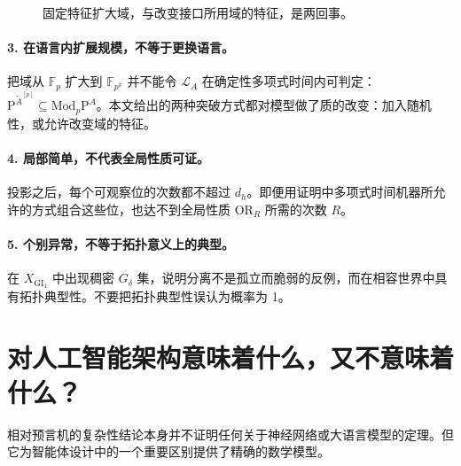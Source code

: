 \documentclass[11pt,a4paper]{article}
\newcommand{\F}{\mathbb F}
\newcommand{\MP}[1]{\mathrm{Mod}_{#1}\mathrm P}
\newcommand{\LA}{\mathcal L_A}
\newcommand{\GI}{\mathrm{GI}_1}
\newcommand{\OR}{\mathrm{OR}}
\begin{document}
\begin{figure}[htbp]\centering
{}
\caption{固定特征扩大域，与改变接口所用域的特征，是两回事。}
\end{figure}

\paragraph{3. 在语言内扩展规模，不等于更换语言。}
把域从 $\F_p$ 扩大到 $\F_{p^k}$ 并不能令 $\LA$ 在确定性多项式时间内可判定：$\mathrm P^{\widetilde A^{[p]}}\subseteq\MP p^A$。本文给出的两种突破方式都对模型做了质的改变：加入随机性，或允许改变域的特征。

\paragraph{4. 局部简单，不代表全局性质可证。}
投影之后，每个可观察位的次数都不超过 $d_h$。即便用证明中多项式时间机器所允许的方式组合这些位，也达不到全局性质 $\OR_R$ 所需的次数 $R$。

\paragraph{5. 个别异常，不等于拓扑意义上的典型。}
在 $X_{\GI}$ 中出现稠密 $G_\delta$ 集，说明分离不是孤立而脆弱的反例，而在相容世界中具有拓扑典型性。不要把拓扑典型性误认为概率为 1。

\section{对人工智能架构意味着什么，又不意味着什么？}
相对预言机的复杂性结论本身并不证明任何关于神经网络或大语言模型的定理。但它为智能体设计中的一个重要区别提供了精确的数学模型。
\end{document}
